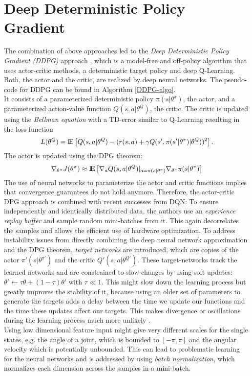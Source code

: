 \section{Deep Deterministic Policy Gradient}
\label{sec:DDPG}
The combination of above approaches led to the \textit{Deep Deterministic Policy Gradient (DDPG)} approach \citep{lillicrap2015continuous}, which is a model-free and off-policy algorithm that uses actor-critic methods, a deterministic target policy and deep Q-Learning. Both, the actor and the critic, are realized by deep neural networks. The pseudo-code for DDPG can be found in Algorithm \ref{DDPG-algo}.\\
It consists of a parameterized deterministic policy  $\pi(s|\theta^\pi)$, the actor, and a parameterized action-value function $Q(s,a|\theta^Q)$, the critic. The critic is updated using the \textit{Bellman equation} with a TD-error similar to Q-Learning \citep{watkins1992q} resulting in the loss function
\[
L(\theta^Q)={\rm I\!E}\left[
Q(s,a|\theta^Q)-(r(s,a) + \gamma Q(s', \pi(s'|\theta^\pi)|\theta^{Q}))^2\right].
\]
The actor is updated using the DPG theorem:
\[
\nabla_{\theta^\pi}J(\theta^\pi)\approx {\rm I\!E}\left[\nabla_aQ(s,a|\theta^Q)|_{a=\pi(s|\theta^\pi)} \nabla_{\theta^\pi}\pi(s|\theta^\pi)\right]
\]
The use of neural networks to parameterize the actor and critic functions implies that convergence guarantees do not hold anymore. Therefore, the actor-critic DPG approach is combined with recent successes from DQN: To ensure independently and identically distributed data, the authors use an \textit{experience replay buffer} and sample random mini-batches from it. This again decorrelates the samples and allows the efficient use of hardware optimization. To address instability issues from directly combining the deep neural network approximation and the DPG theorem, \textit{target networks} are introduced, which are copies of the actor $\pi'(s|\theta^{\pi'})$ and the critic $Q'(s,a|\theta^{Q'})$. These target-networks track the learned networks and are constrained to slow changes by using soft updates: $\theta' \leftarrow \tau\theta + (1-\tau)\theta'$ with $\tau \ll 1$. This might slow down the learning process but greatly improves the stability of it, because using an older set of parameters to generate the targets adds a delay between the time we update our functions and the time these updates affect our targets. This makes divergence or oscillations during the learning process much more unlikely \citep{mnih2015human}.\\
Using low dimensional feature input might give very different scales for the single states, e.g. the angle of a joint, which is bounded to $[-\pi, \pi]$ and the angular velocity which is potentially unbounded. This can lead to problematic learning for the neural networks and is addressed by using \textit{batch normalization}, which normalizes each dimension across the samples in a mini-batch.\\
